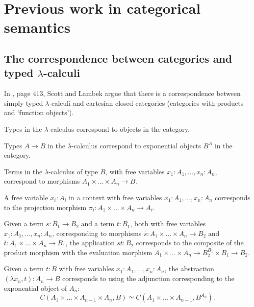 \chapter{Previous work in categorical semantics}

\section{The correspondence between categories and typed \texorpdfstring{$ \lambda $}{lambda}-calculi}\label{sec:lambek-correspondence}
In \cite{curry}, page 413, Scott and Lambek argue that there is a correspondence between simply typed $ \lambda $-calculi and cartesian closed categories (categories with products and `function objects').

Types in the $ \lambda $-calculus correspond to objects in the category.

Types $ A \to B $ in the $ \lambda $-calculus correspond to exponential objects $ B^A $ in the category.

Terms in the $ \lambda $-calculus of type $ B $, with free variables $ x_1: A_1, \dots, x_n: A_n $, correspond to morphisms $ A_1 \times \dots \times A_n \to B $.

A free variable $ x_i: A_i $ in a context with free variables $ x_1: A_1, \dots, x_n: A_n $ corresponds to the projection morphism $ \pi_i : A_1 \times \dots \times A_n \to A_i $.

Given a term $ s: B_1 \to B_2 $ and a term $ t: B_1 $, both with free variables $ x_1: A_1, \dots, x_n: A_n $, corresponding to morphisms $ \overline s: A_1 \times \dots \times A_n \to B_2 $ and $ \overline t: A_1 \times \dots \times A_n \to B_1 $, the application $ st: B_2 $ corresponds to the composite of the product morphism with the evaluation morphism $ A_1 \times \dots \times A_n \to B_2^{B_1} \times B_1 \to B_2 $.
\begin{center}
\end{center}

Given a term $ t: B $ with free variables $ x_1: A_1, \dots, x_n: A_n $, the abstraction $ (\lambda x_n, t): A_n \to B $ corresponds to using the adjunction corresponding to the exponential object of $ A_n $:
\[ C(A_1 \times \dots \times A_{n-1} \times A_n, B) \simeq C(A_1 \times \dots \times A_{n-1}, B^{A_n}). \]


